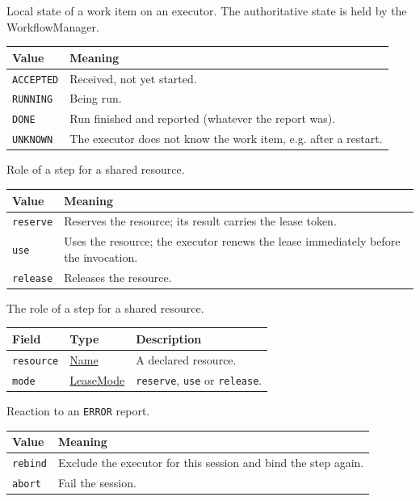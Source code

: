 \documentclass[a4paper]{arrowhead}
\newcommand{\mref}[1]{{\textcolor{ArrowheadPurple}{\hyperref[sec:model:#1]{#1}}}}
\newcommand{\pref}[1]{{\textcolor{ArrowheadGrey}{\hyperref[sec:model:primitives:#1]{#1}}}}
\begin{document}
Local state of a work item on an executor. The authoritative state is held by the WorkflowManager.

{\small
\begin{longtable}{|p{3.9cm}|p{11.9cm}|}

\hline
\rowcolor{gray!33} Value & Meaning \\ \hline
\endhead
\texttt{ACCEPTED} & Received, not yet started. \\ \hline
\texttt{RUNNING} & Being run. \\ \hline
\texttt{DONE} & Run finished and reported (whatever the report was). \\ \hline
\texttt{UNKNOWN} & The executor does not know the work item, e.g. after a restart. \\ \hline
\end{longtable}
}

Role of a step for a shared resource.

{\small
\begin{longtable}{|p{3.9cm}|p{11.9cm}|}

\hline
\rowcolor{gray!33} Value & Meaning \\ \hline
\endhead
\texttt{reserve} & Reserves the resource; its result carries the lease token. \\ \hline
\texttt{use} & Uses the resource; the executor renews the lease immediately before the invocation. \\ \hline
\texttt{release} & Releases the resource. \\ \hline
\end{longtable}
}

The role of a step for a shared resource.

{\small
\begin{longtable}{|p{3.9cm}|p{4.4cm}|p{7.5cm}|}

\hline
\rowcolor{gray!33} Field & Type & Description \\ \hline
\endhead
\texttt{resource} & \pref{Name} & A declared resource. \\ \hline
\texttt{mode} & \mref{LeaseMode} & \texttt{reserve}, \texttt{use} or \texttt{release}. \\ \hline
\end{longtable}
}

Reaction to an \texttt{ERROR} report.

{\small
\begin{longtable}{|p{3.9cm}|p{11.9cm}|}

\hline
\rowcolor{gray!33} Value & Meaning \\ \hline
\endhead
\texttt{rebind} & Exclude the executor for this session and bind the step again. \\ \hline
\texttt{abort} & Fail the session. \\ \hline
\end{longtable}
}
\end{document}
